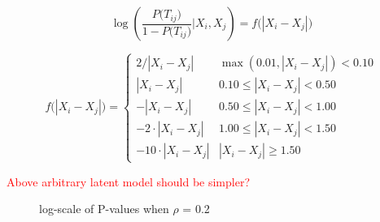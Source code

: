 \documentclass[12pt]{report}
\begin{document}
\begin{equation}
\label{eq:latentspace}
\log \left( \frac{P\big( T_{ij} \big) }{1 - P\big( T_{ij}    \big) } \big| X_i, X_j \right) = f \big( | X_i - X_j |  \big)
\end{equation}


\begin{equation}
\label{eq:model2}
f\big( |X_i - X_j| \big) = \left\{ \begin{array}{cc} 2 / |X_i - X_j| & \max(0.01, |X_i - X_j| ) < 0.10 \\ |X_{i} - X_{j}| & 0.10 \leq |X_{i}  - X_{j}| < 0.50 \\ - |X_{i} - X_{j}| &  0.50 \leq |X_{i}  - X_{j}| < 1.00  \\ - 2 \cdot |X_{i} - X_{j}| &  1.00 \leq |X_{i}  - X_{j}| < 1.50  \\ -10 \cdot |X_i - X_j| & |X_i - X_j| \geq 1.50 \end{array}  \right.
\end{equation}

\textcolor{red}{Above arbitrary latent model should be simpler?}

\begin{figure}[H]
\captionsetup{format=plain}
\centering
{}
\caption{log-scale of P-values when $\rho$ = 0.2}
\label{fig:pAll2}    
\end{figure} 
\end{document}
